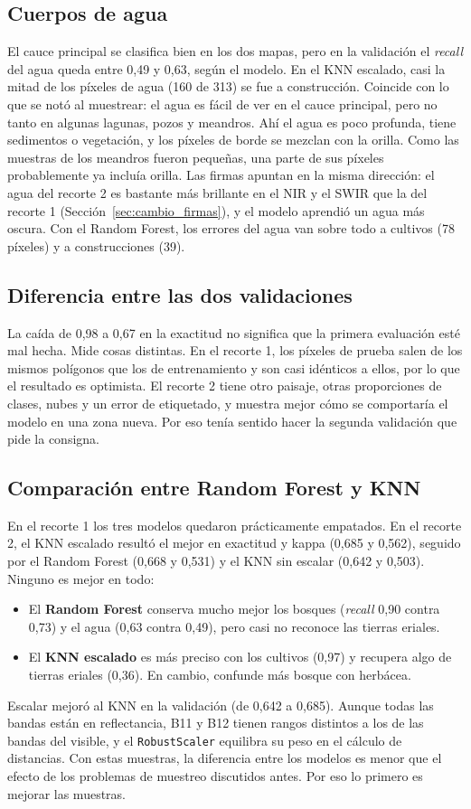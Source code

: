 \documentclass[11pt,letterpaper]{article}
\begin{document}
\subsection{Cuerpos de agua}
El cauce principal se clasifica bien en los dos mapas, pero en la validación el \emph{recall} del agua queda
entre 0,49 y 0,63, según el modelo. En el KNN escalado, casi la mitad de los píxeles de agua (160 de 313)
se fue a construcción. Coincide con lo que se notó al muestrear: el agua es fácil de ver en el cauce
principal, pero no tanto en algunas lagunas, pozos y meandros. Ahí el agua es poco profunda, tiene sedimentos
o vegetación, y los píxeles de borde se mezclan con la orilla. Como las muestras de los meandros fueron
pequeñas, una parte de sus píxeles probablemente ya incluía orilla. Las firmas apuntan en la misma dirección:
el agua del recorte 2 es bastante más brillante en el NIR y el SWIR que la del recorte 1
(Sección~\ref{sec:cambio_firmas}), y el modelo aprendió un agua más oscura. Con el Random Forest, los
errores del agua van sobre todo a cultivos (78 píxeles) y a construcciones (39).

\subsection{Diferencia entre las dos validaciones}
La caída de 0,98 a 0,67 en la exactitud no significa que la primera evaluación esté mal hecha. Mide cosas
distintas. En el recorte 1, los píxeles de prueba salen de los mismos polígonos que los de entrenamiento y
son casi idénticos a ellos, por lo que el resultado es optimista. El recorte 2 tiene otro paisaje, otras
proporciones de clases, nubes y un error de etiquetado, y muestra mejor cómo se comportaría el modelo en una
zona nueva. Por eso tenía sentido hacer la segunda validación que pide la consigna.

\subsection{Comparación entre Random Forest y KNN}
En el recorte 1 los tres modelos quedaron prácticamente empatados. En el recorte 2, el KNN escalado resultó
el mejor en exactitud y kappa (0,685 y 0,562), seguido por el Random Forest (0,668 y 0,531) y el KNN sin
escalar (0,642 y 0,503). Ninguno es mejor en todo:
\begin{itemize}
    \item El \textbf{Random Forest} conserva mucho mejor los bosques (\emph{recall} 0,90 contra 0,73) y el
    agua (0,63 contra 0,49), pero casi no reconoce las tierras eriales.
    \item El \textbf{KNN escalado} es más preciso con los cultivos (0,97) y recupera algo de tierras eriales
    (0,36). En cambio, confunde más bosque con herbácea.
\end{itemize}
Escalar mejoró al KNN en la validación (de 0,642 a 0,685). Aunque todas las bandas están en reflectancia,
B11 y B12 tienen rangos distintos a los de las bandas del visible, y el \texttt{RobustScaler} equilibra su peso
en el cálculo de distancias. Con estas muestras, la diferencia entre los modelos es menor que el efecto de
los problemas de muestreo discutidos antes. Por eso lo primero es mejorar las muestras.
\end{document}
